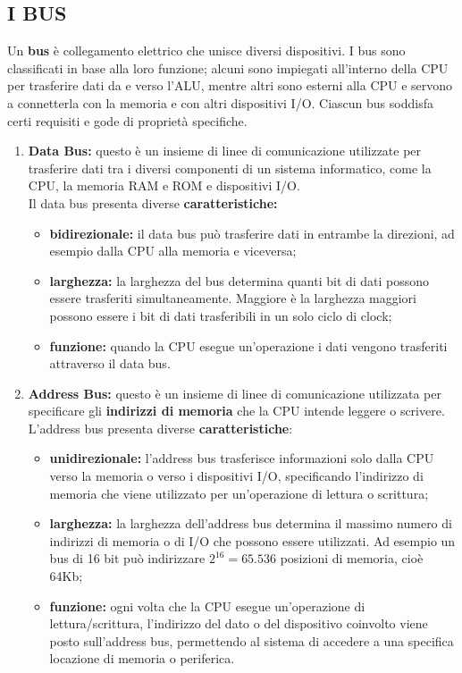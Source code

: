 \documentclass[12pt]{report}
\begin{document}
\subsection{I BUS}
Un \textbf{bus} è collegamento elettrico che unisce diversi dispositivi. I bus sono classificati in base alla loro funzione; alcuni sono impiegati all'interno della CPU per trasferire dati da e verso l'ALU, mentre altri sono esterni alla CPU e servono a connetterla con la memoria e con altri dispositivi I/O. Ciascun bus soddisfa certi requisiti e gode di proprietà specifiche.
\begin{enumerate}
	\item \textbf{Data Bus:} questo è un insieme di linee di comunicazione utilizzate per trasferire dati tra i diversi componenti di un sistema informatico, come la CPU, la memoria RAM e ROM e dispositivi I/O.\\
	Il data bus presenta diverse \textbf{caratteristiche:}
	\begin{itemize}
		\item \textbf{bidirezionale:} il data bus può trasferire dati in entrambe la direzioni, ad esempio dalla CPU alla memoria e viceversa;
		\item \textbf{larghezza:} la larghezza del bus determina quanti bit di dati possono essere trasferiti simultaneamente. Maggiore è la larghezza maggiori possono essere i bit di dati trasferibili in un solo ciclo di clock;
		\item \textbf{funzione:} quando la CPU esegue un'operazione i dati vengono trasferiti attraverso il data bus.
	\end{itemize}
	\item \textbf{Address Bus:} questo è un insieme di linee di comunicazione utilizzata per specificare gli \textbf{indirizzi di memoria} che la CPU intende leggere o scrivere.
	L'address bus presenta diverse \textbf{caratteristiche}:
	\begin{itemize}
		\item \textbf{unidirezionale:} l'address bus trasferisce informazioni solo dalla CPU verso la memoria o verso i dispositivi I/O, specificando l'indirizzo di memoria che viene utilizzato per un'operazione di lettura o scrittura;
		\item \textbf{larghezza:} la larghezza dell'address bus determina il massimo numero di indirizzi di memoria o di I/O che possono essere utilizzati. Ad esempio un bus di 16 bit può indirizzare $2^{16} = 65.536$ posizioni di memoria, cioè 64Kb;
		\item \textbf{funzione:} ogni volta che la CPU esegue un'operazione di lettura/scrittura, l'indirizzo del dato o del dispositivo coinvolto viene posto sull'address bus, permettendo al sistema di accedere a una specifica locazione di memoria o periferica.

\end{itemize}
\end{enumerate}
\end{document}
